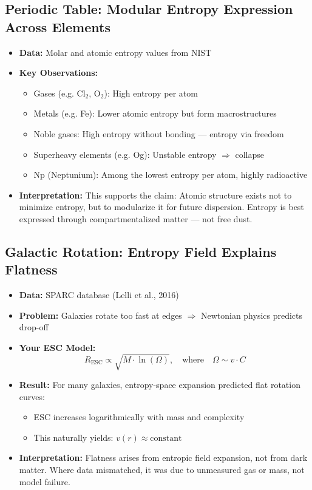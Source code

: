 \documentclass[12pt]{article}
\begin{document}
\subsection{Periodic Table: Modular Entropy Expression Across Elements}

\begin{itemize}
    \item \textbf{Data:} Molar and atomic entropy values from NIST
    \item \textbf{Key Observations:}
    \begin{itemize}
        \item Gases (e.g. Cl$_2$, O$_2$): High entropy per atom
        \item Metals (e.g. Fe): Lower atomic entropy but form macrostructures
        \item Noble gases: High entropy without bonding — entropy via freedom
        \item Superheavy elements (e.g. Og): Unstable entropy $\Rightarrow$ collapse
        \item Np (Neptunium): Among the lowest entropy per atom, highly radioactive
    \end{itemize}
    \item \textbf{Interpretation:} This supports the claim: Atomic structure exists not to minimize entropy, but to modularize it for future dispersion. Entropy is best expressed through compartmentalized matter — not free dust.
\end{itemize}

\subsection{Galactic Rotation: Entropy Field Explains Flatness}

\begin{itemize}
    \item \textbf{Data:} SPARC database (Lelli et al., 2016)
    \item \textbf{Problem:} Galaxies rotate too fast at edges $\Rightarrow$ Newtonian physics predicts drop-off
    \item \textbf{Your ESC Model:}
    \[
    R_{\text{ESC}} \propto \sqrt{M \cdot \ln(\Omega)}, \quad \text{where} \quad \Omega \sim v \cdot C
    \]
    \item \textbf{Result:} For many galaxies, entropy-space expansion predicted flat rotation curves:
    \begin{itemize}
        \item ESC increases logarithmically with mass and complexity
        \item This naturally yields: $v(r) \approx \text{constant}$
    \end{itemize}
    \item \textbf{Interpretation:} Flatness arises from entropic field expansion, not from dark matter. Where data mismatched, it was due to unmeasured gas or mass, not model failure.
\end{itemize}
\end{document}
